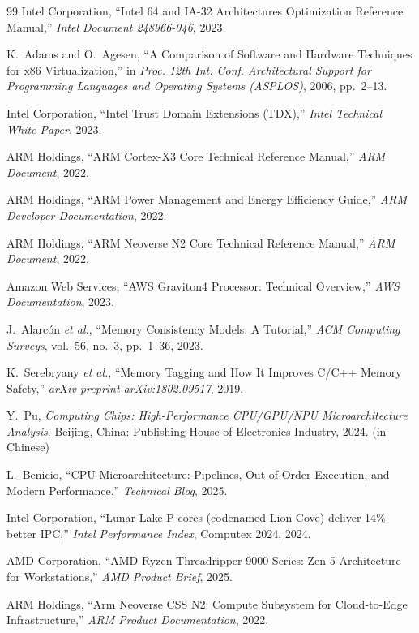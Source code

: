 \documentclass[12pt,a4paper]{IEEEtran}
\begin{document}
\begin{thebibliography}{99}
Intel Corporation,
``Intel 64 and IA-32 Architectures Optimization Reference Manual,''
\textit{Intel Document 248966-046}, 2023.

K.~Adams and O.~Agesen,
``A Comparison of Software and Hardware Techniques for x86 Virtualization,''
in \textit{Proc. 12th Int. Conf. Architectural Support for Programming Languages and Operating Systems (ASPLOS)}, 2006, pp.~2--13.

Intel Corporation,
``Intel Trust Domain Extensions (TDX),''
\textit{Intel Technical White Paper}, 2023.

ARM Holdings,
``ARM Cortex-X3 Core Technical Reference Manual,''
\textit{ARM Document}, 2022.

ARM Holdings,
``ARM Power Management and Energy Efficiency Guide,''
\textit{ARM Developer Documentation}, 2022.

ARM Holdings,
``ARM Neoverse N2 Core Technical Reference Manual,''
\textit{ARM Document}, 2022.

Amazon Web Services,
``AWS Graviton4 Processor: Technical Overview,''
\textit{AWS Documentation}, 2023.

J.~Alarcón \textit{et al.},
``Memory Consistency Models: A Tutorial,''
\textit{ACM Computing Surveys}, vol.~56, no.~3, pp.~1--36, 2023.

K.~Serebryany \textit{et al.},
``Memory Tagging and How It Improves C/C++ Memory Safety,''
\textit{arXiv preprint arXiv:1802.09517}, 2019.

Y.~Pu,
\textit{Computing Chips: High-Performance CPU/GPU/NPU Microarchitecture Analysis}.
Beijing, China: Publishing House of Electronics Industry, 2024. (in Chinese)

L.~Benicio,
``CPU Microarchitecture: Pipelines, Out-of-Order Execution, and Modern Performance,''
\textit{Technical Blog}, 2025.

Intel Corporation,
``Lunar Lake P-cores (codenamed Lion Cove) deliver 14\% better IPC,''
\textit{Intel Performance Index}, Computex 2024, 2024.

AMD Corporation,
``AMD Ryzen Threadripper 9000 Series: Zen 5 Architecture for Workstations,''
\textit{AMD Product Brief}, 2025.

ARM Holdings,
``Arm Neoverse CSS N2: Compute Subsystem for Cloud-to-Edge Infrastructure,''
\textit{ARM Product Documentation}, 2022.

\end{thebibliography}
\end{document}
